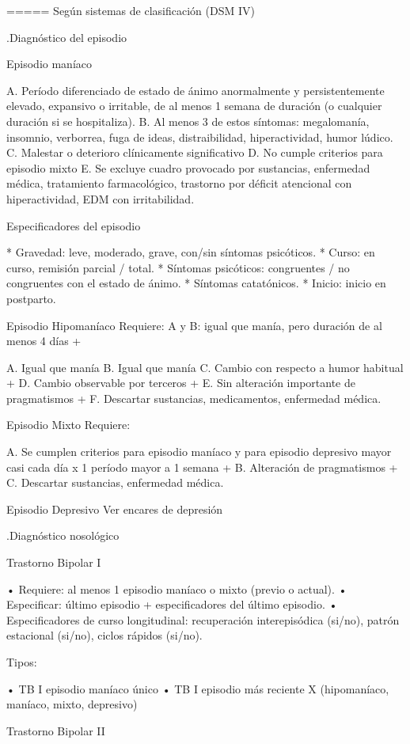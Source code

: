 \documentclass[encares.tex]{subfiles}
\begin{document}
===== Según sistemas de clasificación (DSM IV)

.Diagnóstico del episodio

Episodio maníaco

A. Período diferenciado de estado de ánimo anormalmente y persistentemente elevado, expansivo o irritable, de al menos 1 semana de duración (o cualquier duración si se hospitaliza).
B. Al menos 3 de estos síntomas: megalomanía, insomnio, verborrea, fuga de ideas, distraibilidad, hiperactividad, humor lúdico.
C. Malestar o deterioro clínicamente significativo
D. No cumple criterios para episodio mixto
E. Se excluye cuadro provocado por sustancias, enfermedad médica, tratamiento farmacológico, trastorno por déficit atencional con hiperactividad, EDM con irritabilidad.

Especificadores del episodio

* Gravedad: leve, moderado, grave, con/sin síntomas psicóticos.
* Curso: en curso, remisión parcial / total.
* Síntomas psicóticos: congruentes / no congruentes con el estado de ánimo.
* Síntomas catatónicos.
* Inicio: inicio en postparto.

Episodio Hipomaníaco Requiere: A y B: igual que manía, pero duración de al menos 4 días +

A. Igual que manía
B. Igual que manía
C. Cambio con respecto a humor habitual +
D. Cambio observable por terceros +
E. Sin alteración importante de pragmatismos +
F. Descartar sustancias, medicamentos, enfermedad médica.

Episodio Mixto Requiere:

A. Se cumplen criterios para episodio maníaco y para episodio depresivo mayor casi cada día x 1 período mayor a 1 semana +
B. Alteración de pragmatismos +
C. Descartar sustancias, enfermedad médica.

Episodio Depresivo Ver encares de depresión

.Diagnóstico nosológico

Trastorno Bipolar I

• Requiere: al menos 1 episodio maníaco o mixto (previo o actual).
• Especificar: último episodio + especificadores del último episodio.
• Especificadores de curso longitudinal: recuperación interepisódica (si/no), patrón estacional (si/no), ciclos rápidos (si/no).

Tipos:

• TB I episodio maníaco único
• TB I episodio más reciente X (hipomaníaco, maníaco, mixto, depresivo)

Trastorno Bipolar II
\end{document}
